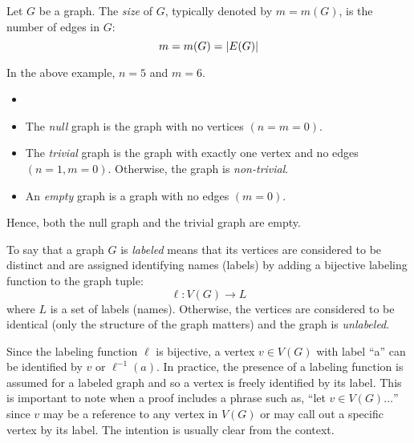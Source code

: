 \documentclass[letterpaper,12pt,fleqn]{article}
\begin{document}
\begin{definition}[Size]
  Let \(G\) be a graph.  The \emph{size} of \(G\), typically denoted by \(m=m(G)\), is the number of edges in \(G\):
  \[m=m(G)=\abs*{E(G)}\]
\end{definition}

In the above example, \(n=5\) and \(m=6\).

\begin{definition}
  \begin{itemize}[left=0in]
  \item[]
  \item The \emph{null} graph is the graph with no vertices \((n=m=0)\).
  \item The \emph{trivial} graph is the graph with exactly one vertex and no edges \((n=1,m=0)\).  Otherwise, the
    graph is \emph{non-trivial}.
  \item An \emph{empty} graph is a graph with no edges \((m=0)\).
  \end{itemize}
  Hence, both the null graph and the trivial graph are empty.
\end{definition}

\begin{definition}
  To say that a graph \(G\) is \emph{labeled} means that its vertices are considered to be distinct and are
  assigned identifying names (labels) by adding a bijective labeling function to the graph tuple:
  \[\ell:V(G)\to L\]
  where \(L\) is a set of labels (names).  Otherwise, the vertices are considered to be identical (only the
  structure of the graph matters) and the graph is \emph{unlabeled}.
\end{definition}

Since the labeling function \(\ell\) is bijective, a vertex \(v\in V(G)\) with label ``a'' can be identified by
\(v\) or \(\ell^{-1}(a)\).  In practice, the presence of a labeling function is assumed for a labeled graph and so
a vertex is freely identified by its label.  This is important to note when a proof includes a phrase such as,
``let \(v\in V(G)\ldots\)'' since \(v\) may be a reference to any vertex in \(V(G)\) or may call out a specific
vertex by its label.  The intention is usually clear from the context.
\end{document}

